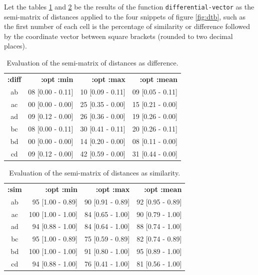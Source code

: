 Let the tables \ref{table:mrdiff} and \ref{table:mrsim} be the results of the function \texttt{differential-vector} as the semi-matrix of distances applied to the four snippets of figure \ref{fig:dtb}, such as the first number of each cell is the percentage of similarity or difference followed by the coordinate vector between square brackets (rounded to two decimal places).

\begin{table}[h!]
\centering
{\ttfamily
\begin{tabular}{|c|r|r|r|}
\hline
\textbf{:diff} & \textbf{:opt :min}        & \textbf{:opt :max}        & \textbf{:opt :mean}       \\
ab    & 08 [0.00 - 0.11] & 10 [0.09 - 0.11] & 09 [0.05 - 0.11] \\
ac    & 00 [0.00 - 0.00] & 25 [0.35 - 0.00] & 15 [0.21 - 0.00] \\
ad    & 09 [0.12 - 0.00] & 26 [0.36 - 0.00] & 19 [0.26 - 0.00] \\
bc    & 08 [0.00 - 0.11] & 30 [0.41 - 0.11] & 20 [0.26 - 0.11] \\
bd    & 00 [0.00 - 0.00] & 14 [0.20 - 0.00] & 08 [0.11 - 0.00] \\
cd    & 09 [0.12 - 0.00] & 42 [0.59 - 0.00] & 31 [0.44 - 0.00] \\
\hline
\end{tabular}}
\caption{Evaluation of the semi-matrix of distances as difference.}
\label{table:mrdiff}
\end{table}

\begin{table}[h!]
\centering
{\ttfamily
\begin{tabular}{|c|r|r|r|}
\hline
\textbf{:sim} & \textbf{:opt :min}        & \textbf{:opt :max}        & \textbf{:opt :mean}       \\
ab  & 95 [1.00 - 0.89]  & 90 [0.91 - 0.89] & 92 [0.95 - 0.89] \\
ac  & 100 [1.00 - 1.00] & 84 [0.65 - 1.00] & 90 [0.79 - 1.00] \\
ad  & 94 [0.88 - 1.00]  & 84 [0.64 - 1.00] & 88 [0.74 - 1.00] \\
bc  & 95 [1.00 - 0.89]  & 75 [0.59 - 0.89] & 82 [0.74 - 0.89] \\
bd  & 100 [1.00 - 1.00] & 91 [0.80 - 1.00] & 95 [0.89 - 1.00] \\
cd  & 94 [0.88 - 1.00]  & 76 [0.41 - 1.00] & 81 [0.56 - 1.00] \\
\hline
\end{tabular}}
\caption{Evaluation of the semi-matrix of distances as similarity.}
\label{table:mrsim}
\end{table}


